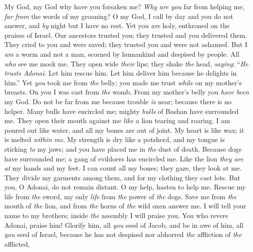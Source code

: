 \begin{biblechapter} %
 My God, my God why have you forsaken me? 
\textit{Why are you} far from helping me, \textit{far from} the words of my groaning?
\verse O my God, I call by day and you do not answer, 
and \textit{by} night but I have no rest.
\verse Yet you \textit{are} holy, 
enthroned on the praises of Israel.
\verse Our ancestors trusted you; 
they trusted and you delivered them.
\verse They cried to you and were saved; 
they trusted you and were not ashamed.
\verse But I \textit{am} a worm and not a man, 
scorned by humankind and despised by people.
\verse All \textit{who} see me mock me. 
They open wide \textit{their} lips; 
they shake \textit{the} head, \textit{saying}:
\verse “\textit{He trusts Adonai}. Let him rescue him. 
Let him deliver him because he delights in him.”
\verse Yet \textit{you} took me from \textit{the} belly; 
you made me trust \textit{while} on my mother’s breasts.
\verse On you I was cast from \textit{the} womb. 
From my mother’s belly you \textit{have been} my God.
\verse Do not be far from me 
because trouble \textit{is} near; 
because there is no helper.
\verse Many bulls have encircled me; 
mighty \textit{bulls} of Bashan have surrounded me.
\verse They open their mouth against me 
\textit{like} a lion tearing and roaring.
\verse I am poured out like water, 
and all my bones are out of joint. 
My heart is like wax; 
it is melted \textit{within me}.
\verse My strength is dry like a potsherd, 
and my tongue is sticking \textit{to} my jaws; 
and you have placed me in \textit{the} dust of death.
\verse Because dogs have surrounded me; 
a gang of evildoers has encircled me. 
Like the lion \textit{they are at} my hands and my feet.
\verse I can count all my bones; 
they gaze, they look at me.
\verse They divide my garments among them, 
and for my clothing they cast lots.
\verse But you, O Adonai, do not remain distant. 
O my help, hasten to help me.
\verse Rescue my life from \textit{the} sword, 
my only \textit{life} from \textit{the} power of \textit{the} dogs.
\verse Save me from \textit{the} mouth of \textit{the} lion, 
and from \textit{the} horns of \textit{the} wild oxen answer me.
\verse I will tell your name to my brothers; 
inside \textit{the} assembly I will praise you.
\verse You who revere Adonai, praise him! 
Glorify him, all \textit{you} seed of Jacob, 
and be in awe of him, all \textit{you} seed of Israel,
\verse because he has not despised nor abhorred \textit{the} affliction of \textit{the} afflicted, 

\end{biblechapter}

